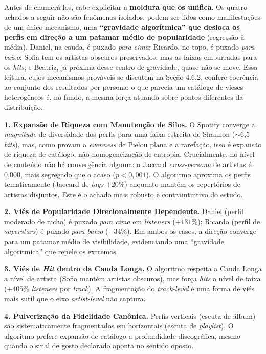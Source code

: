 \documentclass[12pt, %
openright,
oneside, %
a4paper,    %
english,   %
brazil]{facom-ufu-abntex2}
\begin{document}
Antes de enumerá-los, cabe explicitar a \textbf{moldura que os unifica}. Os
quatro achados a seguir não são fenômenos isolados: podem ser lidos como
manifestações de um único mecanismo, uma \textbf{``gravidade algorítmica'' que
desloca os perfis em direção a um patamar médio de popularidade} (regressão à
média). Daniel, na cauda, é puxado \emph{para cima}; Ricardo, no topo, é puxado
\emph{para baixo}; Sofia tem os artistas obscuros preservados, mas as faixas
empurradas para os \emph{hits}; e Beatriz, já próxima desse centro de gravidade,
quase não se move. Essa leitura, cujos mecanismos prováveis se discutem na
Seção 4.6.2, confere coerência ao conjunto dos resultados por
persona: o que parecia um catálogo de vieses heterogêneos é, no fundo, a mesma
força atuando sobre pontos diferentes da distribuição.

\textbf{1. Expansão de Riqueza com Manutenção de Silos.} O Spotify converge a
\emph{magnitude} de diversidade dos perfis para uma faixa estreita de Shannon
($\sim$6,5 \emph{bits}), mas, como provam a \emph{evenness} de Pielou plana e a
rarefação, isso é expansão de riqueza de catálogo, não homogeneização de
entropia. Crucialmente, no nível de conteúdo não há convergência alguma: o
Jaccard \emph{cross-persona} de artistas é 0,000, mais segregado que o acaso
($p < 0{,}001$). O algoritmo aproxima os perfis tematicamente (Jaccard de
\emph{tags} $+20\%$) enquanto mantém os repertórios de artistas disjuntos. Este é
o achado mais robusto e contraintuitivo do estudo.

\textbf{2. Viés de Popularidade Direcionalmente Dependente.} Daniel (perfil
moderado de nicho) é puxado \emph{para cima} em \emph{listeners} ($+131\%$);
Ricardo (perfil de \emph{superstars}) é puxado \emph{para baixo} ($-34\%$). Em
ambos os casos, a direção converge para um patamar médio de visibilidade,
evidenciando uma ``gravidade algorítmica'' que repele os extremos.

\textbf{3. Viés de \emph{Hit} dentro da Cauda Longa.} O algoritmo respeita a
Cauda Longa a nível de artista (Sofia mantém artistas obscuros), mas força
\emph{hits} a nível de faixa ($+405\%$ \emph{listeners} por \emph{track}). A
fragmentação do \emph{track-level} é uma forma de viés mais sutil que o eixo
\emph{artist-level} não captura.

\textbf{4. Pulverização da Fidelidade Canônica.} Perfis verticais (escuta de
álbum) são sistematicamente fragmentados em horizontais (escuta de
\emph{playlist}). O algoritmo prefere expansão de catálogo a profundidade
discográfica, mesmo quando o sinal de gosto declarado aponta no sentido oposto.
\end{document}
